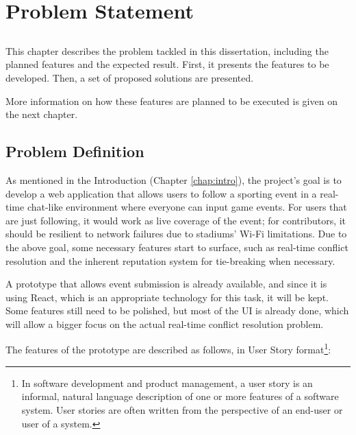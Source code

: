 \chapter{Problem Statement}\label{chap:problem}

\section*{}

This chapter describes the problem tackled in this dissertation, including the planned features and the expected result. First, it presents the features to be developed. Then, a set of proposed solutions are presented.

More information on how these features are planned to be executed is given on the next chapter.

\section{Problem Definition}\label{sec:prob-def}

As mentioned in the Introduction (Chapter \ref{chap:intro}), the project's goal is to develop a web application that allows users to follow a sporting event in a real-time chat-like environment where everyone can input game events. For users that are just following, it would work as live coverage of the event; for contributors, it should be resilient to network failures due to stadiums' Wi-Fi limitations.
Due to the above goal, some necessary features start to surface, such as real-time conflict resolution and the inherent reputation system for tie-breaking when necessary. 

A prototype that allows event submission is already available, and since it is using React, which is an appropriate technology for this task, it will be kept. Some features still need to be polished, but most of the UI is already done, which will allow a bigger focus on the actual real-time conflict resolution problem.

The features of the prototype are described as follows, in User Story format\footnote{In software development and product management, a user story is an informal, natural language description of one or more features of a software system. User stories are often written from the perspective of an end-user or user of a system.}:

